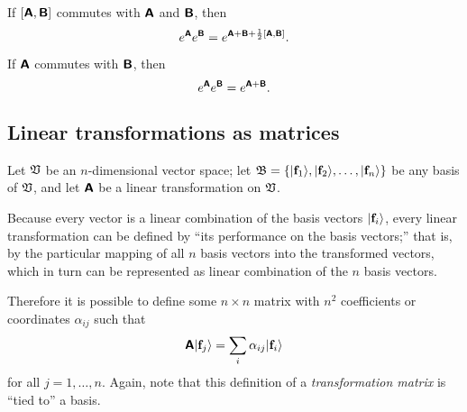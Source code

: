 If $[\textsf{\textbf{A}},\textsf{\textbf{B}}]$ commutes with $\textsf{\textbf{A}}$ and
$\textsf{\textbf{B}}$, then
 \begin{equation}
 e^\textsf{\textbf{A}}e^\textsf{\textbf{B}}=
e^{\textsf{\textbf{A}}+\textsf{\textbf{B}}+{1\over 2}\left[\textsf{\textbf{A}},\textsf{\textbf{B}}\right]}.
 \end{equation}

If  $\textsf{\textbf{A}}$ commutes with $\textsf{\textbf{B}}$, then
 \begin{equation}
 e^\textsf{\textbf{A}}e^\textsf{\textbf{B}}=
e^{\textsf{\textbf{A}}+\textsf{\textbf{B}}}.
 \end{equation}

\subsection{Linear transformations as matrices}




Let ${\frak V}$ be an $n$-dimensional vector space;
let
${\frak B}=\{\vert {\bf f}_1 \rangle ,\vert {\bf f}_2 \rangle,\ldots ,\vert {\bf f}_n \rangle\}$ be any basis of ${\frak V}$,
and let  $\textsf{\textbf{A}}$ be a linear transformation on ${\frak V}$.

Because every vector is a linear combination of the basis vectors
$\vert {\bf f}_i \rangle$,
every linear transformation can be defined by
``its performance on the basis vectors;'' that is,
by the particular mapping of
all $n$ basis vectors into the transformed vectors, which in turn can be represented as linear combination of the $n$ basis vectors.

Therefore it is possible to define some $n \times n$ matrix with $n^2$ coefficients or coordinates
$\alpha_{ij}$ such that
\begin{equation}
\textsf{\textbf{A}}\vert  {\bf f}_j \rangle = \sum_i \alpha_{ij}\vert {\bf f}_i  \rangle
\label{2015-m-ch-fdlvs-dtlt}
\end{equation}
for all $j=1,\ldots ,n$.
Again, note that this definition of a {\em transformation matrix}
is ``tied to'' a basis.


